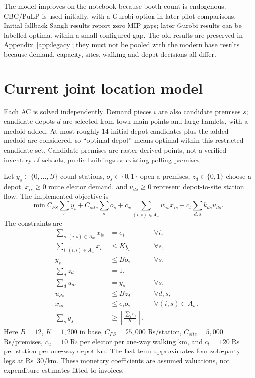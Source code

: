 \documentclass[11pt,a4paper,oneside]{report}
\newcommand{\source}[1]{\par\nopagebreak[4]{\footnotesize\color{teal}Evidence: #1.}\par}
\begin{document}
The model improves on the notebook because booth count is endogenous. CBC/PuLP is used initially, with a Gurobi option in later pilot comparisons. Initial fallback Sangli results report zero MIP gaps; later Gurobi results can be labelled optimal within a small configured gap. The old results are preserved in Appendix~\ref{app:legacy}; they must not be pooled with the modern base results because demand, capacity, sites, walking and depot decisions all differ.
\source{[S3]}

\section{Current joint location model}
Each AC is solved independently. Demand pieces $i$ are also candidate premises $s$; candidate depots $d$ are selected from town main points and large hamlets, with a medoid added. At most roughly 14 initial depot candidates plus the added medoid are considered, so ``optimal depot'' means optimal within this restricted candidate set. Candidate premises are raster-derived points, not a verified inventory of schools, public buildings or existing polling premises.

Let $y_s\in\{0,\ldots,B\}$ count stations, $o_s\in\{0,1\}$ open a premises, $z_d\in\{0,1\}$ choose a depot, $x_{is}\geq0$ route elector demand, and $u_{ds}\geq0$ represent depot-to-site station flow. The implemented objective is
\begin{equation}\label{eq:location}
 \min C_{PS}\sum_s y_s+C_{site}\sum_s o_s+
 c_w\sum_{(i,s)\in A_w}w_{is}x_{is}+c_t\sum_{d,s}k_{ds}u_{ds}.
\end{equation}
The constraints are
\begin{align}
 \sum_{s:(i,s)\in A_w}x_{is}&=e_i &&\forall i,\\
 \sum_{i:(i,s)\in A_w}x_{is}&\leq K y_s &&\forall s,\\
 y_s&\leq B o_s &&\forall s,\\
 \sum_d z_d&=1,\\
 \sum_d u_{ds}&=y_s &&\forall s,\\
 u_{ds}&\leq Bz_d &&\forall d,s,\\
 x_{is}&\leq e_i o_s &&\forall(i,s)\in A_w,\\
 \sum_s y_s&\geq\left\lceil\frac{\sum_i e_i}{K}\right\rceil.
\end{align}
Here $B=12$, $K=1,200$ in base, $C_{PS}=25,000$ Rs/station, $C_{site}=5,000$ Rs/premises, $c_w=10$ Rs per elector per one-way walking km, and $c_t=120$ Rs per station per one-way depot km. The last term approximates four solo-party legs at Rs~30/km. These monetary coefficients are assumed valuations, not expenditure estimates fitted to invoices.
\end{document}
